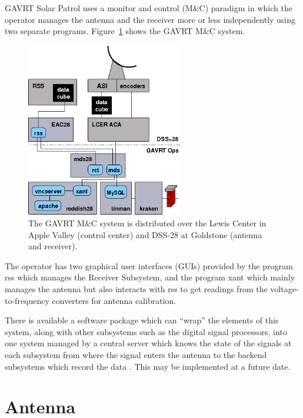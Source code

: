 \documentclass[letterpaper,11pt]{report}
\begin{document}
GAVRT Solar Patrol uses a monitor and control (M\&C) paradigm in which the 
operator manages the antenna and the receiver more or less independently using 
two separate programs.  Figure~\ref{fig:M&C} shows the GAVRT M\&C system.
\begin{figure}[h!tb]
    \begin{center}
        \includegraphics[width=2.7in]{DSS28-netmap.png}
        \caption{\label{fig:M&C}The GAVRT M\&C system is distributed over
            the Lewis Center in Apple Valley (control center) and DSS-28
            at Goldstone (antenna and receiver).}
    \end{center}
\end{figure}
The operator has two graphical user interfaces (GUIs) provided by the program 
{\ttfamily rss} which manages the Receiver Subsystem, and the program 
{\ttfamily xant} which mainly manages the antenna but also interacts with 
{\ttfamily rss} to get readings from the voltage-to-frequency converters 
for antenna calibration.

There is available a software package which can ``wrap'' the elements of this
system, along with other subsystems such as the digital signal processors,
into one system managed by a central server which knows the state of the
signals at each subsystem from where the signal enters the antenna to the
backend subsystems which record the data \cite{kuiper:2019}.  This may be 
implemented at a future date.

\section{Antenna}
\end{document}
